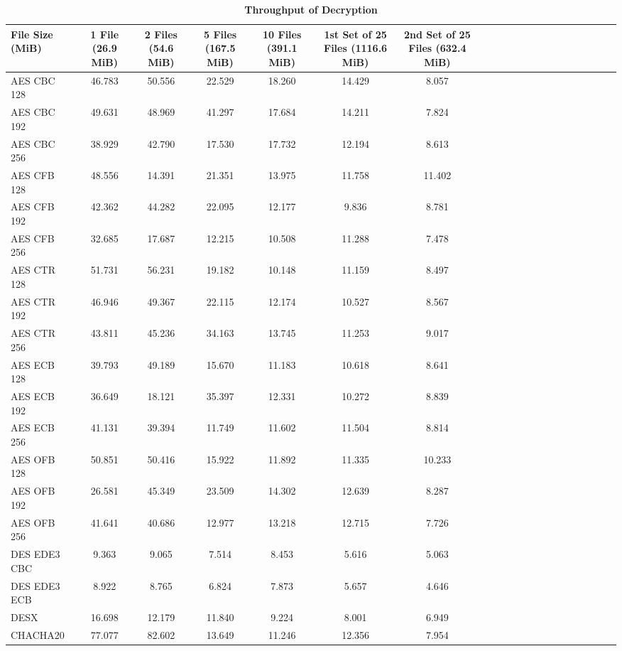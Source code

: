 \documentclass[conference]{IEEEtran}
\begin{document}
\begin{table}[htbp]
\begin{center}
\begin{tabularx}{\textwidth}{@{}l*{19}{C}c@{}}
			\bottomrule
			\hline
		\end{tabularx} %
	\end{center}
\end{table}

\begin{table}[htbp]
	\begin{center}
		\caption{\textbf{Throughput of Decryption}}
		\begin{tabularx}{\textwidth}{@{}l*{19}{C}c@{}}
			\hline
			\toprule
			File Size (MiB) & 1 File (26.9 MiB) & 2 Files (54.6 MiB) & 5 Files (167.5 MiB) & 10 Files (391.1 MiB) & 1st Set of 25 Files (1116.6 MiB) & 2nd Set of 25 Files (632.4 MiB) \\
			
			\midrule
			AES CBC 128  & 46.783 & 50.556 & 22.529 & 18.260 & 14.429 & 8.057 \\
			AES CBC 192  & 49.631 & 48.969 & 41.297 & 17.684 & 14.211 & 7.824 \\
			AES CBC 256  & 38.929 & 42.790 & 17.530 & 17.732 & 12.194 & 8.613 \\
			AES CFB 128  & 48.556 & 14.391 & 21.351 & 13.975 & 11.758 & 11.402\\
			AES CFB 192  & 42.362 & 44.282 & 22.095 & 12.177 & 9.836  & 8.781 \\
			AES CFB 256  & 32.685 & 17.687 & 12.215 & 10.508 & 11.288 & 7.478 \\
			\addlinespace
			AES CTR 128  & 51.731 & 56.231 & 19.182 & 10.148 & 11.159 & 8.497 \\
			AES CTR 192  & 46.946 & 49.367 & 22.115 & 12.174 & 10.527 & 8.567 \\
			AES CTR 256  & 43.811 & 45.236 & 34.163 & 13.745 & 11.253 & 9.017 \\
			AES ECB 128  & 39.793 & 49.189 & 15.670 & 11.183 & 10.618 & 8.641 \\
			AES ECB 192  & 36.649 & 18.121 & 35.397 & 12.331 & 10.272 & 8.839 \\
			AES ECB 256  & 41.131 & 39.394 & 11.749 & 11.602 & 11.504 & 8.814 \\
			\addlinespace
			AES OFB 128  & 50.851 & 50.416 & 15.922 & 11.892 & 11.335 & 10.233\\
			AES OFB 192  & 26.581 & 45.349 & 23.509 & 14.302 & 12.639 & 8.287 \\
			AES OFB 256  & 41.641 & 40.686 & 12.977 & 13.218 & 12.715 & 7.726 \\
			\addlinespace
			DES EDE3 CBC & 9.363  & 9.065  & 7.514  & 8.453  & 5.616  & 5.063 \\
			DES EDE3 ECB & 8.922  & 8.765  & 6.824  & 7.873  & 5.657  & 4.646 \\
			DESX         & 16.698 & 12.179 & 11.840 & 9.224  & 8.001  & 6.949 \\
			CHACHA20     & 77.077 & 82.602 & 13.649 & 11.246 & 12.356 & 7.954 \\
			\bottomrule
			\hline
		\end{tabularx} %
	\end{center}
\end{table}
\end{document}
